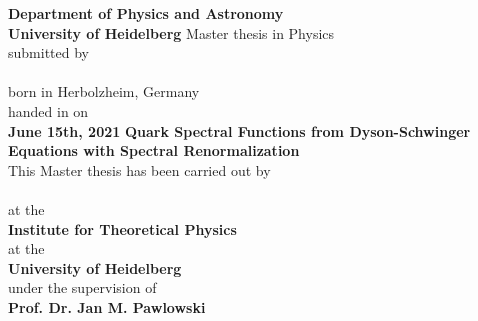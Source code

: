 {\hypersetup{allcolors=black}
\begin{titlepage}
\begin{center}
		\makeatletter
				\vspace{2cm}
		\Large\textbf{Department of Physics and Astronomy\\
			 University of Heidelberg}
		\vfill
		\normalsize
		Master thesis in Physics\\
		\normalsize
		submitted by\\[0.4cm]
		\Large
		\textbf{\@author}\\
		\normalsize
		born in Herbolzheim, Germany \\ [0.4cm]
		handed in on\\
		\Large
		\textbf{June 15th, 2021}
		\cleardoublepage
		\thispagestyle{empty}
		\vspace{2cm}
		\Large\textbf{Quark Spectral Functions from Dyson-Schwinger Equations with Spectral Renormalization}\\[.4cm]
		\vfill
		\normalsize
		This Master thesis has been carried out by \\ 
		\vspace{3pt}
		\textbf{\@author}  \\ 
		\vspace{3pt}
		at the\\
		\vspace{3pt}
		\textbf{Institute for Theoretical Physics} \\ at the \\\textbf{University of Heidelberg}\\
		\vspace{5pt}
		under the supervision of\\
		\vspace{5pt}
		\textbf{Prof. Dr. Jan M. Pawlowski}\\
		\makeatother
\cleardoublepage
\end{center}
\end{titlepage}} 
